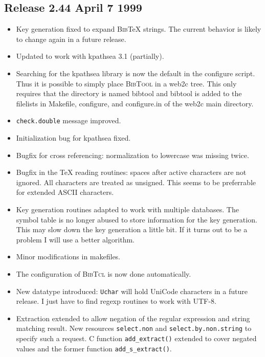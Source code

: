 \documentclass[11pt,a4paper]{scrartcl}
\newcommand\rsc[1]{\texttt{#1}}
\newcommand\BibTool{\textsc{BibTool}}
\newcommand\BibTcl{\textsc{BibTcl}}
\newcommand\BibTeX{\textsc{Bib}\TeX}
\newenvironment{Release}[2]{%
  \def\tmp{#2}%
  \section*{Release #1 \ifx\tmp\empty\else{\normalsize[#2]}\fi}
  \begin{itemize}
}{\end{itemize}}
\newenvironment{Fix}[1]{\item }{}
\newenvironment{New}[1]{\item }{}
\newenvironment{Update}[1]{\item }{}
\begin{document}
\begin{multicols}
 \begin{Release}{2.44}{April 7 1999}
  \begin{Fix}{gene}
    Key generation fixed to expand \BibTeX{} strings. The current
    behavior is likely to change again in a future release.
  \end{Fix}
  \begin{Update}{gene}
    Updated to work with kpathsea 3.1 (partially).
  \end{Update}
  \begin{New}{gene}
    Searching for the kpathsea library is now the default in the
    configure script. Thus it is possible to simply place \BibTool{}
    in a web2c tree. This only requires that the directory is named
    bibtool and bibtool is added to the filelists in Makefile,
    configure, and configure.in of the web2c main directory.
  \end{New}
  \begin{Fix}{gene}
    \rsc{check.double} message improved.
  \end{Fix}
  \begin{Fix}{gene}
    Initialization bug for kpathsea fixed.
  \end{Fix}
  \begin{Fix}{gene}
    Bugfix for cross referencing: normalization to lowercase was
    missing twice.
  \end{Fix}
  \begin{Fix}{gene}
    Bugfix in the \TeX{} reading routines: spaces after active
    characters are not ignored. All characters are treated as
    unsigned. This seems to be preferrable for extended ASCII
    characters.
  \end{Fix}
  \begin{Update}{gene}
    Key generation routines adapted to work with multiple databases.
    The symbol table is no longer abused to store information for the
    key generation. This may slow down the key generation a little
    bit. If it turns out to be a problem I will use a better
    algorithm.
  \end{Update}
  \begin{Update}{gene}
    Minor modifications in makefiles.
  \end{Update}
  \begin{New}{gene}
    The configuration of \BibTcl{} is now done automatically.
  \end{New}
  \begin{New}{gene}
    New datatype introduced: \verb|Uchar| will hold UniCode characters in a
    future release. I just have to find regexp routines to work with UTF-8.
  \end{New}
  \begin{Update}{gene}
    Extraction extended to allow negation of the regular expression and string
    matching result. New resources \rsc{select.non} and
    \rsc{select.by.non.string} to specify such a request. C function
    \verb|add_extract()| extended to cover negated values and the former
    function \verb|add_s_extract()|.
  \end{Update}
 \end{Release}


\end{multicols}
\end{document}
